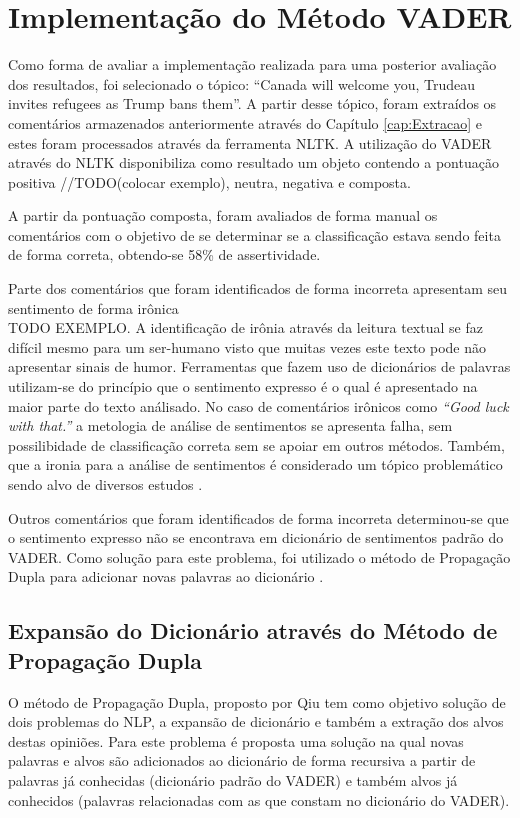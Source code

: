 \chapter{Implementação do Método \ac{VADER}}
\label{cap:impl}
Como forma de avaliar a implementação realizada para uma posterior avaliação dos
resultados, foi selecionado o tópico: ``Canada will welcome you, Trudeau
invites refugees as Trump bans them''. A partir desse tópico, foram extraídos os
comentários armazenados anteriormente através do Capítulo \ref{cap:Extracao} e
estes foram processados através da ferramenta \ac{NLTK}. A utilização do
\ac{VADER} através do \ac{NLTK} disponibiliza como resultado um objeto contendo
a pontuação positiva //TODO(colocar exemplo), neutra, negativa e composta. 

A partir da
pontuação composta, foram avaliados de forma manual os comentários com o
objetivo de se determinar se a classificação estava sendo feita de forma
correta, obtendo-se 58\% de assertividade.

Parte dos comentários que foram identificados de forma
incorreta apresentam seu sentimento de forma irônica \\TODO EXEMPLO. A
identificação de irônia através da leitura textual se faz difícil mesmo
para um ser-humano visto que muitas vezes este texto pode não apresentar sinais
de humor. Ferramentas que fazem uso de dicionários de palavras
utilizam-se do princípio que o sentimento expresso é o qual é
apresentado na maior parte do texto análisado. No caso de comentários
irônicos como \textit{``Good luck with that.''} a metologia de análise de
sentimentos se apresenta falha, sem possilibidade de classificação correta sem
se apoiar em outros métodos. Também, que a ironia para a análise de sentimentos
é considerado um tópico problemático sendo alvo de diversos estudos
\cite{DBLP:conf/lrec/StranisciBFP16}.

Outros comentários que foram identificados de forma incorreta determinou-se que
o sentimento expresso não se encontrava em dicionário de sentimentos padrão do
\ac{VADER}. Como solução para este problema, foi utilizado o método de
Propagação Dupla para adicionar novas palavras ao dicionário
\cite{Qiu:2011:OWE:1970420.1970422}.

\section{Expansão do Dicionário através do Método de Propagação Dupla}

O método de Propagação Dupla, proposto por Qiu
\cite{Qiu:2011:OWE:1970420.1970422} tem como objetivo solução de dois problemas
do \ac{NLP}, a expansão de dicionário e também a extração dos alvos destas
opiniões. Para este problema é proposta uma solução na qual novas palavras e
alvos são adicionados ao dicionário de forma recursiva a partir de palavras já
conhecidas (dicionário padrão do \ac{VADER}) e também alvos já conhecidos
(palavras relacionadas com as que constam no dicionário do \ac{VADER}).

